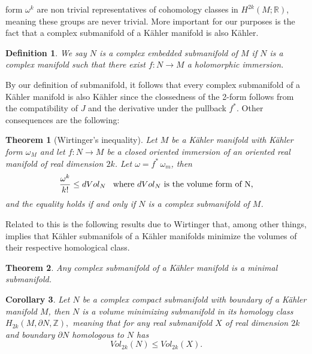 \documentclass[letterpaper]{book}
\newtheorem{theorem}{Theorem}[section]
\newtheorem{cor}[theorem]{Corollary}
\newtheorem{definition}{Definition}[section]
\newcommand{\zah}{\ensuremath{ \mathbb Z }}
\newcommand{\re}{\ensuremath{\mathbb R }}
\begin{document}
form $\omega^k$ are non trivial representatives of cohomology classes in
$H^{2k}(M ;\re)$, meaning these groups are never trivial. More important
for our purposes is the fact that a complex submanifold of a Kähler
manifold is also K\"ahler.
\begin{definition}
        We say $N$ is a complex embedded submanifold of $M$ if $N$ is a complex manifold such that there exist $f:N\rightarrow M$
        a holomorphic immersion.
\end{definition}
        By our definition of submanifold, it follows that every complex submanifold of a Kähler manifold is also Kähler
        since the clossedness of the 2-form follows from the compatibility of $J$ and the derivative under the pullback
        $f^*$. Other consequences are the following:

        \begin{theorem}[Wirtinger's inequality]
        Let $M$ be a Kähler manifold with Kähler form $\omega_M$ and let $f:N\rightarrow M$ be a closed oriented immersion
        of an oriented real manifold of real dimension $2k$. Let $\omega=f^*\,\omega_m$, then
        \begin{equation}
                        \frac{\omega^k}{k!}\leq dVol_N\hspace{0.3cm}\text{where }dVol_N\text{ is the volume form of N,}
        \end{equation}
        and the equality holds if and only if $N$ is a complex submanifold of $M$.
\end{theorem}
Related to this is the following results due to Wirtinger that, among other things, implies that Kähler submanifols of a Kähler manifolds minimize the volumes of their respective homological class.

\begin{theorem}
        Any complex submanifold of a Kähler manifold is a minimal submanifold.
\end{theorem}
\begin{cor}\label{wirtinger}
        Let $N$ be a complex compact submanifold with boundary of a Kähler manifold $M$, then $N$ is a volume minimizing
        submanifold in its homology class $H_{2k}(M,\partial N,\zah),$ meaning that for any real submanifold $X$ of
        real dimension $2k$ and boundary $\partial N$ homologous to $N$ has $$Vol_{2k}(N)\leq Vol_{2k}(X).$$
\end{cor}
\end{document}
